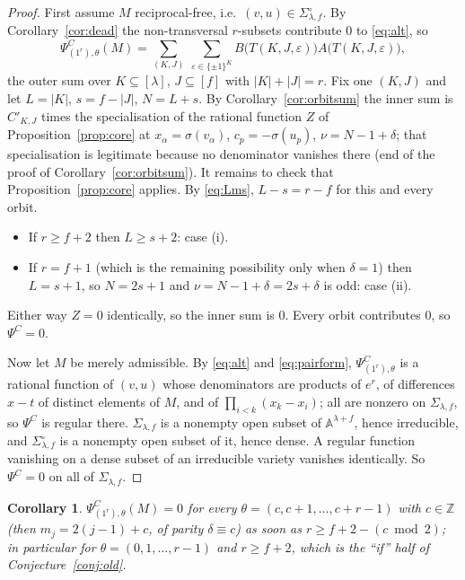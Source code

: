 \documentclass[11pt]{article}
\newtheorem{corollary}[theorem]{Corollary}
\theoremstyle{definition}
\theoremstyle{remark}
\newcommand{\PsiC}{\Psi^{C}}
\newcommand{\ZZ}{\mathbb{Z}}
\newcommand{\bftheta}{\theta}
\begin{document}
\begin{proof}
First assume $M$ reciprocal-free, i.e.\ $(v,u)\in\Sigma^{\circ}_{\lambda,f}$. By
Corollary~\ref{cor:dead} the non-transversal $r$-subsets contribute $0$ to
\eqref{eq:alt}, so
\[
  \PsiC_{(1^r),\bftheta}(M)
  =\sum_{(K,J)}\ \sum_{\varepsilon\in\{\pm1\}^{K}}
     B\bigl(T(K,J,\varepsilon)\bigr)A\bigl(T(K,J,\varepsilon)\bigr),
\]
the outer sum over $K\subseteq[\lambda]$, $J\subseteq[f]$ with $|K|+|J|=r$. Fix one
$(K,J)$ and let $L=|K|$, $s=f-|J|$, $N=L+s$. By Corollary~\ref{cor:orbitsum} the inner
sum is $C'_{K,J}$ times the specialisation of the rational function $Z$ of
Proposition~\ref{prop:core} at $x_\alpha=\sigma(v_\alpha)$, $c_p=-\sigma(u_p)$,
$\nu=N-1+\delta$; that specialisation is legitimate because no denominator vanishes
there (end of the proof of Corollary~\ref{cor:orbitsum}). It remains to check that
Proposition~\ref{prop:core} applies. By \eqref{eq:Lms}, $L-s=r-f$ for this and every
orbit.
\begin{itemize}
\item If $r\ge f+2$ then $L\ge s+2$: case (i).
\item If $r=f+1$ (which is the remaining possibility only when $\delta=1$) then
      $L=s+1$, so $N=2s+1$ and $\nu=N-1+\delta=2s+\delta$ is odd: case (ii).
\end{itemize}
Either way $Z=0$ identically, so the inner sum is $0$. Every orbit contributes $0$, so
$\PsiC=0$.

Now let $M$ be merely admissible. By \eqref{eq:alt} and \eqref{eq:pairform},
$\PsiC_{(1^r),\bftheta}$ is a rational function of $(v,u)$ whose denominators are
products of $e^r$, of differences $x-t$ of distinct elements of $M$, and of
$\prod_{i<k}(x_k-x_i)$; all are nonzero on $\Sigma_{\lambda,f}$, so $\PsiC$ is regular
there. $\Sigma_{\lambda,f}$ is a nonempty open subset of
$\mathbb{A}^{\lambda+f}$, hence irreducible, and $\Sigma^{\circ}_{\lambda,f}$ is a
nonempty open subset of it, hence dense. A regular function vanishing on a dense subset
of an irreducible variety vanishes identically. So $\PsiC=0$ on all of
$\Sigma_{\lambda,f}$.
\end{proof}

\begin{corollary}\label{cor:scope}
$\PsiC_{(1^r),\bftheta}(M)=0$ for every $\bftheta=(c,c+1,\dots,c+r-1)$ with $c\in\ZZ$
(then $m_j=2(j-1)+c$, of parity $\delta\equiv c$) as soon as $r\ge f+2-(c\bmod2)$; in
particular for $\bftheta=(0,1,\dots,r-1)$ and $r\ge f+2$, which is the ``if'' half of
Conjecture~\ref{conj:old}.
\end{corollary}
\end{document}
